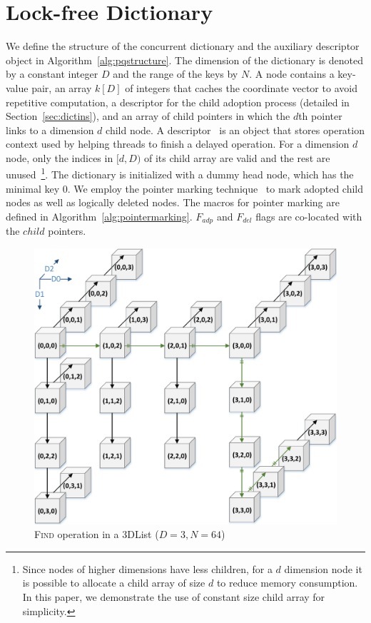\documentclass[10pt,conference,compsocconf]{IEEEtran}
\begin{document}
\section{Lock-free Dictionary}
We define the structure of the concurrent dictionary and the auxiliary descriptor object in Algorithm~\ref{alg:pqstructure}.
The dimension of the dictionary is denoted by a constant integer $D$ and the range of the keys by $N$.
A node contains a key-value pair, an array $k[D]$ of integers that caches the coordinate vector to avoid repetitive computation, a descriptor for the child adoption process (detailed in Section~\ref{sec:dictins}), and an array of child pointers in which the $d$th pointer links to a dimension $d$ child node.
A descriptor~\cite{herlihy2012art} is an object that stores operation context used by helping threads to finish a delayed operation.
For a dimension $d$ node, only the indices in $[d,D)$ of its child array are valid and the rest are unused~\footnote{Since nodes of higher dimensions have less children, for a $d$ dimension node it is possible to allocate a child array of size $d$ to reduce memory consumption. In this paper, we demonstrate the use of constant size child array for simplicity.}.
The dictionary is initialized with a dummy head node, which has the minimal key 0.
We employ the pointer marking technique~\cite{harris2001pragmatic} to mark adopted child nodes as well as logically deleted nodes. 
The macros for pointer marking are defined in Algorithm~\ref{alg:pointermarking}.
$F_{adp}$ and $F_{del}$ flags are co-located with the $child$ pointers.

\begin{figure}[t]
    \centering
    \includegraphics[width=1\columnwidth]{./graph/mdlist-3d}
    \caption{\textsc{Find} operation in a 3DList ($D=3,N=64$)}
    \label{fig:mdlist3d}
    \vspace{-0.22in}
\end{figure}
\end{document}
